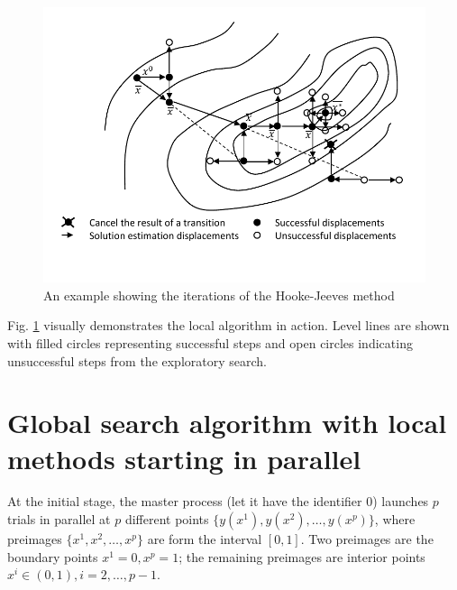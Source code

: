 \documentclass[runningheads]{llncs}
\begin{document}
\begin{figure} 
	\begin{center} 
		\begin{minipage}[h]{0.8\linewidth} 
			\includegraphics[width=1\linewidth]{figure/fig1.pdf} 
			\caption{An example showing the iterations of the Hooke-Jeeves method} %
			\label{fig:fig1} 
		\end{minipage} 
	\end{center} 
\end{figure}	


Fig. \ref{fig:fig1} visually demonstrates the local algorithm in action. Level lines are shown with filled circles representing successful steps and open circles indicating unsuccessful steps from the exploratory search. 


\section{Global search algorithm with local methods starting in parallel}\label{SecGSA}


At the initial stage, the master process (let it have the identifier 0) launches $p$ trials in parallel at $p$ different points $\{y\left(x^1\right),y\left(x^2\right),\ldots,y\left(x^p\right)\}$, where preimages $\{x^1,x^2,\ldots,x^p\}$ are form the interval $[0,1]$.
Two preimages are the boundary points $x^1=0, x^p=1$; the remaining preimages are interior points $x^i\in\left(0,1\right),i=2,\ldots,p-1$.
\end{document}
